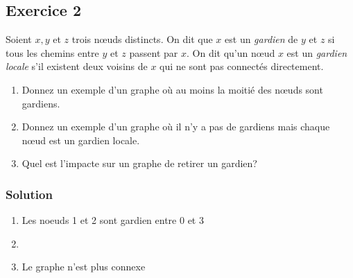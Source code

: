 \subsection*{Exercice 2}
Soient $x, y$ et $z$ trois n\oe{}uds distincts. On dit que $x$ est un \emph{gardien} de $y$ et $z$ si tous les chemins entre $y$ et $z$ passent par $x$.
On dit qu'un n\oe{}ud $x$ est un \emph{gardien locale} s'il existent deux voisins de $x$ qui ne sont pas connect\'{e}s directement.
 
\begin{enumerate}
\item Donnez un exemple d'un graphe o\`{u} au moins la moiti\'{e} des n\oe{}uds sont
gardiens.
\item Donnez un exemple d'un graphe o\`{u} il n'y a pas de gardiens mais chaque n\oe{}ud est un gardien locale.
\item Quel est l'impacte sur un graphe de retirer un gardien?
\end{enumerate}

\subsubsection*{Solution}
\begin{enumerate}
	\item Les noeuds 1 et 2 sont gardien entre 0 et 3 

\begin{center}  
\end{center}

	\item  \hspace{1em}
	\vspace{1em}

\begin{center}  
\end{center}

	\item Le graphe n'est plus connexe
\end{enumerate}

